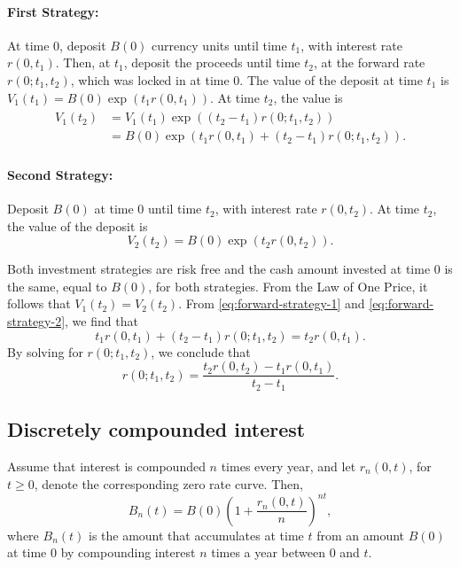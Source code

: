 \paragraph{First Strategy:}
At time 0, deposit $ B(0) $ currency units until time $ t_1 $, with interest
    rate $ r(0, t_1) $.
Then, at $ t_1 $, deposit the proceeds until time $ t_2 $, at the forward rate
    $ r(0; t_1, t_2) $, which was locked in at time 0.
The value of the deposit at time $ t_1 $ is $ V_1(t_1) =
    B(0) \exp (t_1 r(0, t_1)) $.
At time $ t_2 $, the value is
\begin{align}
    \begin{split}
        V_1(t_2) &= V_1(t_1) \exp((t_2 - t_1) r(0; t_1, t_2)) \\
                 &= B(0) \exp ( t_1 r(0, t_1) + (t_2 - t_1) r(0; t_1, t_2)).
        \label{eq:forward-strategy-1}
    \end{split}
\end{align}

\paragraph{Second Strategy:}
Deposit $ B(0) $ at time 0 until time $ t_2 $, with interest rate $ r(0, t_2) $.
At time $ t_2 $, the value of the deposit is
\begin{equation}
    V_2(t_2) = B(0) \exp (t_2 r(0, t_2)).
    \label{eq:forward-strategy-2}
\end{equation}

Both investment strategies are risk free and the cash amount invested at time 0
    is the same, equal to $ B(0) $, for both strategies.
From the Law of One Price, it follows that $ V_1(t_2) = V_2(t_2) $.
From \eqref{eq:forward-strategy-1} and \eqref{eq:forward-strategy-2}, we find
    that
\begin{equation*}
    t_1 r(0, t_1) + (t_2 - t_1) r(0; t_1, t_2) = t_2 r(0, t_1).
\end{equation*}
By solving for $ r(0; t_1, t_2) $, we conclude that
\begin{equation}
    r(0; t_1, t_2) = \frac{t_2 r(0, t_2) - t_1 r(0, t_1)}{t_2 - t_1}.
    \label{eq:forward-rate}
\end{equation}

\subsection{Discretely compounded interest}
Assume that interest is compounded $ n $ times every year, and let
    $ r_n(0, t) $, for $ t \geq 0 $, denote the corresponding zero rate curve.
Then,
\begin{equation}
    B_n(t) = B(0) \left( 1 + \frac{r_n(0, t)}{n} \right)^{nt},
    \label{eq:discrete-compounded-interest}
\end{equation}
where $ B_n(t) $ is the amount that accumulates at time $ t $ from an amount
    $ B(0) $ at time 0 by compounding interest $ n $ times a year between 0 and
    $ t $.

